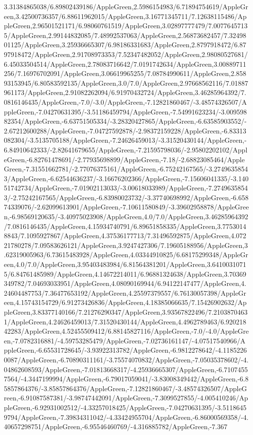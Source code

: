 {\begin{tikzternal}
3.31384865038/6.89802439186/AppleGreen,2.5986154983/6.71894754619/AppleGreen,3.42500736357/6.88611962015/AppleGreen,3.16771345711/7.12638115486/AppleGreen,2.96501521171/6.98060761519/AppleGreen,3.02897777479/7.00776457135/AppleGreen,2.99144832085/7.48992537063/AppleGreen,2.56873682457/7.3249801125/AppleGreen,3.25936665307/6.98186331683/AppleGreen,2.8797918472/6.8797918472/AppleGreen,2.91708973353/7.52347482052/AppleGreen,2.98080527681/6.45033504514/AppleGreen,2.78083716642/7.0191742634/AppleGreen,3.00889711256/7.16976702091/AppleGreen,3.06619965255/7.08784990611/AppleGreen,2.85893153945/6.80583592135/AppleGreen,3.0/7.0/AppleGreen,2.97668562116/7.01887961173/AppleGreen,2.91082262094/6.91970432724/AppleGreen,3.46285964392/7.0816146435/AppleGreen,-7.0/-3.0/AppleGreen,-7.12821860467/-3.48574326507/AppleGreen,-7.04270631395/-3.51186459794/AppleGreen,-7.54991623234/-3.00959882354/AppleGreen,-6.63751505334/-3.28320427865/AppleGreen,-6.63585903552/-2.67212600288/AppleGreen,-7.04727592878/-2.98372159228/AppleGreen,-6.83313082304/-3.5135705188/AppleGreen,-7.24626459013/-3.31520430144/AppleGreen,-6.84910642333/-2.82641679655/AppleGreen,-7.21595798036/-2.95802202102/AppleGreen,-6.82761478691/-2.77935698899/AppleGreen,-7.18/-2.68823085464/AppleGreen,-7.31551662781/-2.77076375161/AppleGreen,-6.75242167565/-3.27496358543/AppleGreen,-6.62544636237/-3.16676202366/AppleGreen,-7.15606041335/-3.14051742734/AppleGreen,-7.01902113033/-3.00618033989/AppleGreen,-7.27496358543/-2.75242167565/AppleGreen,-6.83980023732/-3.37740698992/AppleGreen,-6.65874339076/-2.62099613901/AppleGreen,-7.10611580849/-3.39602958878/AppleGreen,-6.98569120635/-3.40975023908/AppleGreen,4.0/7.0/AppleGreen,3.46285964392/7.0816146435/AppleGreen,4.15934740791/6.89651858335/AppleGreen,3.77530148843/7.1095927867/AppleGreen,4.37536177713/7.31496592875/AppleGreen,4.07221780278/7.09583626121/AppleGreen,3.9247427306/7.19605188956/AppleGreen,3.62319005963/6.73615483928/AppleGreen,4.03344910825/6.68175299348/AppleGreen,4.0/7.0/AppleGreen,3.95403483984/6.81564381201/AppleGreen,3.64100310715/6.84761485989/AppleGreen,4.14672214011/6.96881324638/AppleGreen,3.70369349782/7.04693033951/AppleGreen,4.08090169944/6.94122147477/AppleGreen,4.24604487753/7.36477653192/AppleGreen,4.25597379557/6.76130057398/AppleGreen,4.15743154729/6.91273426836/AppleGreen,4.18385066635/7.15426902632/AppleGreen,3.83377140166/7.21276290347/AppleGreen,3.93567822496/7.21038704631/AppleGreen,4.24626459013/7.31520430144/AppleGreen,4.4962789463/6.92021842283/AppleGreen,4.52455509412/6.88145827116/AppleGreen,-7.0/-4.0/AppleGreen,-7.0782316881/-4.59753285479/AppleGreen,-7.02736161147/-4.07517540966/AppleGreen,-6.65531728645/-3.93922313782/AppleGreen,-6.9812278642/-4.11852260087/AppleGreen,-6.70890311161/-3.75574070832/AppleGreen,-7.05035378602/-4.04862608593/AppleGreen,-7.01813668317/-4.25936665307/AppleGreen,-6.71074557564/-4.3447199994/AppleGreen,-6.79017059041/-3.83008349442/AppleGreen,-6.85857864376/-3.85857864376/AppleGreen,-7.12821860467/-3.48574326507/AppleGreen,-6.91087587381/-3.98747442091/AppleGreen,-7.3099527855/-4.005410246/AppleGreen,-6.92931002512/-4.33257018425/AppleGreen,-7.04270631395/-3.51186459794/AppleGreen,-7.39834311042/-4.33424955704/AppleGreen,-6.86000569358/-4.40657298751/AppleGreen,-6.95546460769/-4.316885782/AppleGreen,-7.367
\end{tikzternal}}

